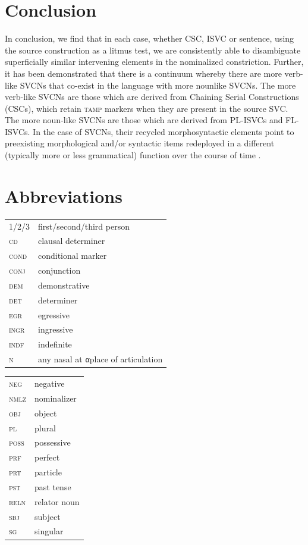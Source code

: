 \documentclass[output=paper,modfonts,nonflat,colorlinks, citecolor=brown, hidelinks]{langsci/langscibook}
\begin{document}
\section{Conclusion}\label{sec:duah:5}
\largerpage
In conclusion, we find that in each case, whether CSC, ISVC or  sentence, using the source construction as a litmus test, we are consistently able to disambiguate superficially similar intervening elements in the nominalized constriction. Further, it has been demonstrated that there is a continuum whereby there are more verb-like SVCNs that co-exist in the language with more nounlike SVCNs. The more verb-like SVCNs are those which are derived from Chaining Serial Constructions (CSCs), which retain \textsc{tamp} markers when they are present in the source SVC. The more noun-like SVCNs are those which are derived from PL-ISVCs and FL-ISVCs. In the case of SVCNs, their recycled morphosyntactic elements point to preexisting morphological and/or syntactic items redeployed in a different (typically more or less grammatical) function over the course of time \citep{booij2007}.



\section*{Abbreviations}
\begin{tabularx}{.45\textwidth}{>{\scshape}lQ}
1/2/3 & first/second/{third person}\\
 cd & clausal determiner\\
 cond & {conditional} marker\\
 conj & conjunction\\
 dem & demonstrative\\
 det & determiner\\
 egr & egressive\\
 ingr & ingressive\\
 indf & indefinite\\
 n & any nasal at αplace of articulation\\
\end{tabularx}
\begin{tabularx}{.45\textwidth}{>{\scshape}lQ}
 neg & negative\\ 
 nmlz & nominalizer\\
 obj & object\\
 pl & plural\\
 poss & possessive\\
 prf & {perfect}\\
 prt & particle\\
 pst & {past tense}\\
 reln & relator noun\\
 sbj & {subject}\\
 sg & singular
\\
\end{tabularx}
\end{document}
